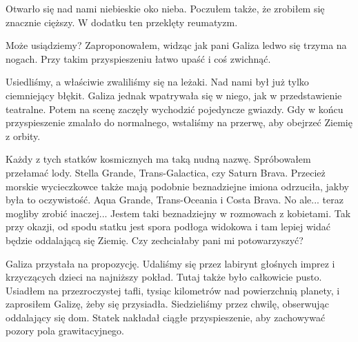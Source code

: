 Otwarło się nad nami niebieskie oko nieba.
Poczułem także, że zrobiłem się znacznie cięższy.
W dodatku ten przeklęty reumatyzm.

\begin{dialogue}
	\ds{} Może usiądziemy? \dm{} Zaproponowałem, widząc jak pani Galiza ledwo się trzyma na nogach. \dm{} Przy takim przyspieszeniu łatwo upaść i coś zwichnąć.
\end{dialogue}

Usiedliśmy, a właściwie zwaliliśmy się na leżaki.
Nad nami był już tylko ciemniejący błękit.
Galiza jednak wpatrywała się w niego, jak w przedstawienie teatralne.
Potem na scenę zaczęły wychodzić pojedyncze gwiazdy.
Gdy w końcu przyspieszenie zmalało do normalnego, wstaliśmy na przerwę, aby obejrzeć Ziemię z orbity.

\begin{dialogue}
	\ds{} Każdy z tych statków kosmicznych ma taką nudną nazwę. \dm{} Spróbowałem przełamać lody. \dm{} Stella Grande, Trans-Galactica, czy Saturn Brava. 
	\ds{} Przecież morskie wycieczkowce także mają podobnie beznadziejne imiona \dm{} odrzuciła, jakby była to oczywistość. \dm{} Aqua Grande, Trans-Oceania i Costa Brava.
	\ds{} No ale... teraz mogliby zrobić inaczej... \dm{} Jestem taki beznadziejny w rozmowach z kobietami. \dm{} 
			Tak przy okazji, od spodu statku jest spora podłoga widokowa i tam lepiej widać będzie oddalającą się Ziemię. Czy zechciałaby pani mi potowarzyszyć?
\end{dialogue}

Galiza przystała na propozycję.
Udaliśmy się przez labirynt głośnych imprez i krzyczących dzieci na najniższy pokład.
Tutaj także było całkowicie pusto.
Usiadłem na przezroczystej tafli, tysiąc kilometrów nad powierzchnią planety, i zaprosiłem Galizę, żeby się przysiadła.
Siedzieliśmy przez chwilę, obserwując oddalający się dom. Statek nakładał ciągłe przyspieszenie, aby zachowywać pozory pola grawitacyjnego.

